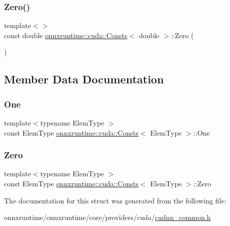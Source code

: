 \mbox{\label{structonnxruntime_1_1cuda_1_1Consts_a1a7393e3e210a4a21452837318e877cd}} 
\subsubsection{\texorpdfstring{Zero()}{Zero()}\hspace{0.1cm}{\footnotesize\ttfamily [2/2]}}
{\footnotesize\ttfamily template$<$$>$ \\
const double \mbox{\hyperlink{structonnxruntime_1_1cuda_1_1Consts}{onnxruntime\+::cuda\+::\+Consts}}$<$ double $>$\+::Zero (\begin{DoxyParamCaption}{ }\end{DoxyParamCaption})}



\subsection{Member Data Documentation}
\mbox{\label{structonnxruntime_1_1cuda_1_1Consts_a73d7ebc26d74926613591143f5c10c17}} 
\subsubsection{\texorpdfstring{One}{One}}
{\footnotesize\ttfamily template$<$typename Elem\+Type $>$ \\
const Elem\+Type \mbox{\hyperlink{structonnxruntime_1_1cuda_1_1Consts}{onnxruntime\+::cuda\+::\+Consts}}$<$ Elem\+Type $>$\+::One\hspace{0.3cm}{\ttfamily [static]}}

\mbox{\label{structonnxruntime_1_1cuda_1_1Consts_ab6f7227147bc807338f6039a190cdcda}} 
\subsubsection{\texorpdfstring{Zero}{Zero}}
{\footnotesize\ttfamily template$<$typename Elem\+Type $>$ \\
const Elem\+Type \mbox{\hyperlink{structonnxruntime_1_1cuda_1_1Consts}{onnxruntime\+::cuda\+::\+Consts}}$<$ Elem\+Type $>$\+::Zero\hspace{0.3cm}{\ttfamily [static]}}



The documentation for this struct was generated from the following file\+:\begin{DoxyCompactItemize}
\item 
onnxruntime/onnxruntime/core/providers/cuda/\mbox{\hyperlink{cudnn__common_8h}{cudnn\+\_\+common.\+h}}\end{DoxyCompactItemize}
